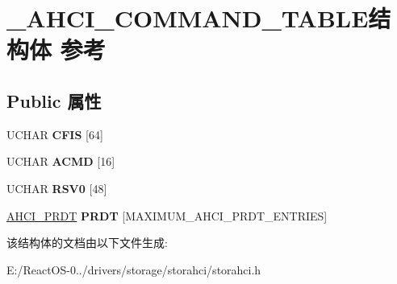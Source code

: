\hypertarget{struct___a_h_c_i___c_o_m_m_a_n_d___t_a_b_l_e}{}\section{\+\_\+\+A\+H\+C\+I\+\_\+\+C\+O\+M\+M\+A\+N\+D\+\_\+\+T\+A\+B\+L\+E结构体 参考}
\label{struct___a_h_c_i___c_o_m_m_a_n_d___t_a_b_l_e}
\subsection*{Public 属性}
\begin{DoxyCompactItemize}
\item 
\mbox{\label{struct___a_h_c_i___c_o_m_m_a_n_d___t_a_b_l_e_a877c5eb229a44e5c1e7d932bac7cdf6a}} 
U\+C\+H\+AR {\bfseries C\+F\+IS} \mbox{[}64\mbox{]}
\item 
\mbox{\label{struct___a_h_c_i___c_o_m_m_a_n_d___t_a_b_l_e_ab6053b5a859137c25358d992643f16be}} 
U\+C\+H\+AR {\bfseries A\+C\+MD} \mbox{[}16\mbox{]}
\item 
\mbox{\label{struct___a_h_c_i___c_o_m_m_a_n_d___t_a_b_l_e_aebd41f67802b5187f1dad280389d4d0a}} 
U\+C\+H\+AR {\bfseries R\+S\+V0} \mbox{[}48\mbox{]}
\item 
\mbox{\label{struct___a_h_c_i___c_o_m_m_a_n_d___t_a_b_l_e_acf9c5550f8cb6dc339c2dd6bfce20f3b}} 
\hyperlink{struct___a_h_c_i___p_r_d_t}{A\+H\+C\+I\+\_\+\+P\+R\+DT} {\bfseries P\+R\+DT} \mbox{[}M\+A\+X\+I\+M\+U\+M\+\_\+\+A\+H\+C\+I\+\_\+\+P\+R\+D\+T\+\_\+\+E\+N\+T\+R\+I\+ES\mbox{]}
\end{DoxyCompactItemize}


该结构体的文档由以下文件生成\+:\begin{DoxyCompactItemize}
\item 
E\+:/\+React\+O\+S-\/0../drivers/storage/storahci/storahci.\+h\end{DoxyCompactItemize}
